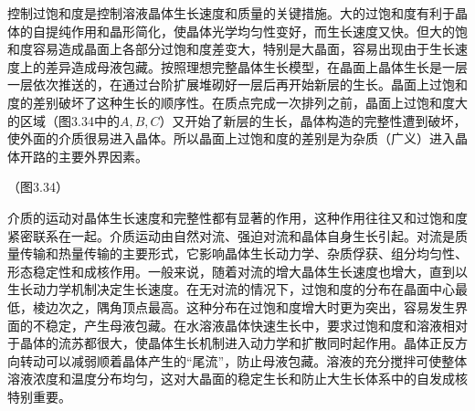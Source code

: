 \begin{enumerate}[(i)]
控制过饱和度是控制溶液晶体生长速度和质量的关键措施。大的过饱和度有利于晶体的自提纯作用和晶形简化，使晶体光学均匀性变好，而生长速度又快。但大的饱和度容易造成晶面上各部分过饱和度差变大，特别是大晶面，容易出现由于生长速度上的差异造成母液包藏。按照理想完整晶体生长模型，在晶面上晶体生长是一层一层依次推送的，在通过台阶扩展堆砌好一层后再开始新层的生长。晶面上过饱和度的差别破坏了这种生长的顺序性。在质点完成一次排列之前，晶面上过饱和度大的区域（图3.34中的$A, B, C$）又开始了新层的生长，晶体构造的完整性遭到破坏，使外面的介质很易进入晶体。所以晶面上过饱和度的差别是为杂质（广义）进入晶体开路的主要外界因素。

（图3.34）

介质的运动对晶体生长速度和完整性都有显著的作用，这种作用往往又和过饱和度紧密联系在一起。介质运动由自然对流、强迫对流和晶体自身生长引起。对流是质量传输和热量传输的主要形式，它影响晶体生长动力学、杂质俘获、组分均匀性、形态稳定性和成核作用。一般来说，随着对流的增大晶体生长速度也增大，直到以生长动力学机制决定生长速度。在无对流的情况下，过饱和度的分布在晶面中心最低，棱边次之，隅角顶点最高。这种分布在过饱和度增大时更为突出，容易发生界面的不稳定，产生母液包藏。在水溶液晶体快速生长中，要求过饱和度和溶液相对于晶体的流苏都很大，使晶体生长机制进入动力学和扩散同时起作用。晶体正反方向转动可以减弱顺着晶体产生的“尾流”，防止母液包藏。溶液的充分搅拌可使整体溶液浓度和温度分布均匀，这对大晶面的稳定生长和防止大生长体系中的自发成核特别重要。


\end{enumerate}